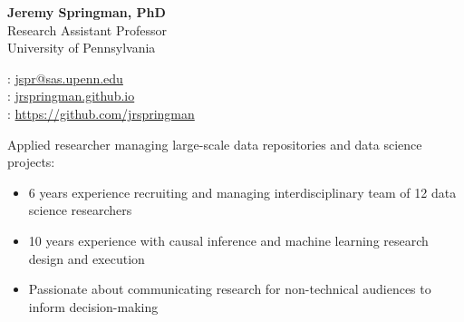 \documentclass[11pt]{article}
\renewcommand{\today}{\monthname[\the\month] \the\year}
\begin{document}
\thispagestyle{empty}



\begin{multicols}{2}
{\Large {\bf Jeremy Springman, PhD}}\\
Research Assistant Professor\\
University of Pennsylvania\\

\columnbreak
\begin{flushright}

\faEnvelope: \href{mailto:jspr@sas.upenn.edu}{jspr@sas.upenn.edu}\\
\faLaptop: \url{jrspringman.github.io}\\
\faGithub: \url{https://github.com/jrspringman}\\
\end{flushright}
\end{multicols}
\vspace{-10pt}

Applied researcher managing large-scale data repositories and data science projects:
\begin{itemize}[itemsep=0mm, parsep=0pt]
\item 6 years experience recruiting and managing interdisciplinary team of 12 data science researchers
\item 10 years experience with causal inference and machine learning research design and execution
\item Passionate about communicating research for non-technical audiences to inform decision-making
\end{itemize}
\end{document}
